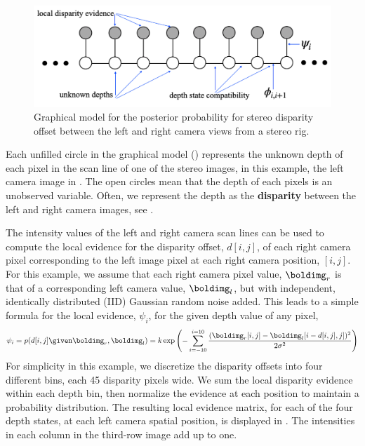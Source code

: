 \begin{figure}
\centerline{
\includegraphics[width=0.80\linewidth]{figures/graphical_models/stereomodel2.jpg}
}
\caption{Graphical model for the posterior probability for stereo disparity offset between the left and right camera views from a stereo rig.}
\label{fig:canoe3}
\end{figure}

Each unfilled circle in the graphical model (\fig{\ref{fig:canoe3}}) represents the unknown depth of each pixel in the scan line of one of the stereo images, in this example, the left camera image in .  The open circles mean that the depth of each pixels is an unobserved variable.  Often, we represent the depth as the {\bf disparity} between the left and right camera images, see \chap{\ref{chap:stereo_vision}}.


The intensity values of the left and right camera scan lines can be used to compute the local evidence for the disparity offset, $d[i, j]$, of each right camera pixel corresponding to the left image pixel at each right camera position, $[i,j]$.  For this example, we assume that each right camera pixel value, $\boldimg_r$ is that of a corresponding left camera value, $\boldimg_l$, but with independent, identically distributed (IID) Gaussian random noise added.  This leads to a simple formula for the local evidence, $\psi_i$, for the given depth value of any pixel,
\begin{equation}
    \psi_i = p(d[i,j] \given \boldimg_r, \boldimg_l) =  k \exp{\left( -\sum_{i=-10}^{i=10} \frac{(\boldimg_r[i,j] - \boldimg_l[i - d[i, j], j])^2}{2 \sigma^2}  \right)}
\end{equation}
For simplicity in this example, we discretize the disparity offsets into four different bins, each 45 disparity pixels wide.  We sum the local disparity evidence within each depth bin, then normalize the evidence at each position to maintain a probability distribution.  The resulting local evidence matrix, for each of the four depth states, at each left camera spatial position, is displayed in .  The intensities in each column in the third-row image add up to one.


